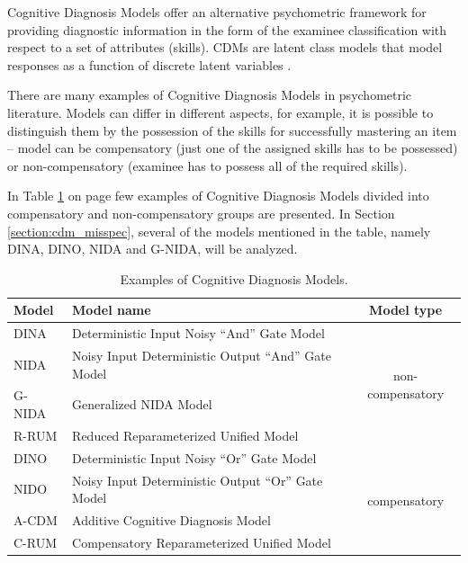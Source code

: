 \documentclass[english]{pwr_wmat_praca_dyplomowa}
\theoremstyle{plain}
\numberwithin{theorem}{chapter}
\theoremstyle{definition}
\numberwithin{theorem}{chapter}
\begin{document}
	Cognitive Diagnosis Models offer an alternative psychometric framework for providing diagnostic information in the form of the examinee classification with respect to a set of attributes (skills). CDMs are latent class models that model responses as a function of discrete latent variables \cite{de_la_torre_2014}. 
	
	There are many examples of Cognitive Diagnosis Models in psychometric literature. Models can differ in different aspects, for example, it is possible to distinguish them by the possession of the skills for successfully mastering an item -- model can be compensatory (just one of the assigned skills has to be possessed) or non-compensatory (examinee has to possess all of the required skills). 
	
	In Table \ref{tab:cdms} on page \pageref{tab:cdms} few examples of Cognitive Diagnosis Models divided into compensatory and non-compensatory groups are presented. In Section \ref{section:cdm_misspec}, several of the models mentioned in the table, namely DINA, DINO, NIDA and G-NIDA, will be analyzed. 
	
	\begin{table}[t]
		\centering
		\small
		\begin{tabular}{l l c} 
			\hline  
			{\rule{0pt}{3ex}}Model & Model name & Model type \\ [0.5ex]
			\hline 
			{\rule{0pt}{3ex}}DINA & Deterministic Input Noisy ``And'' Gate Model \cite{dina_model} & \multirow{4}{*}{non-compensatory} \\
			NIDA & Noisy Input Deterministic Output ``And'' Gate Model \cite{nida_maris} \qquad & \\
			G-NIDA & Generalized NIDA Model \cite{nida_maris} & \\
			R-RUM & Reduced Reparameterized Unified Model \cite{rrum} & \\
			\hline
			{\rule{0pt}{3ex}}DINO & Deterministic Input Noisy ``Or'' Gate Model \cite{dino_model} & \multirow{4}{*}{compensatory}\\
			NIDO & Noisy Input Deterministic Output ``Or'' Gate Model \cite{book_models} & \\
			A-CDM & Additive Cognitive Diagnosis Model \cite{de_la_torre_2011} & \\
			C-RUM & Compensatory Reparameterized Unified Model \cite{rrum} & \\ [0.5ex] 
			\hline
		\end{tabular}
		\caption{Examples of Cognitive Diagnosis Models.}
		\label{tab:cdms} 
	\end{table}
	
\end{document}
